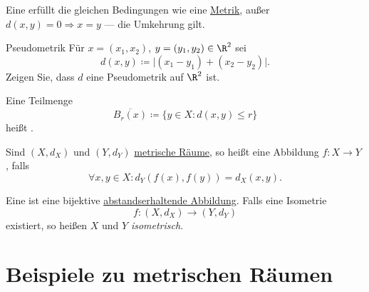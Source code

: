 \begin{definition}[Pseudometrik]\label{def:pseudometrik}
  Eine  erfüllt die gleichen Bedingungen wie eine \hyperref[def:metrik]{Metrik}, außer \( d(x,y) = 0 \Rightarrow x = y \) --- die Umkehrung gilt.
\end{definition}

\begin{assignment}{Pseudometrik}
  Für \( x = (x_1, x_2) \), \( y = (y_1, y_2) \in \R^2 \) sei
  \begin{equation*}
    d(x,y) \coloneqq \vert (x_1 - y_1) + (x_2-y_2) \vert\text{.}
  \end{equation*}
  Zeigen Sie, dass \( d \) eine Pseudometrik auf \( \R^2 \) ist.
\end{assignment}

\begin{definition}\label{def:abgeschlossenerBall}
  Eine Teilmenge
  \begin{equation*}
    \overline{B_r(x)} \coloneqq \{ y \in X : d(x,y) \leq r \}
  \end{equation*}
  heißt .
\end{definition}

\begin{definition}\label{def:abstandserhaltendeAbbildung}
  Sind \( (X, d_X) \) und \( (Y, d_Y) \) \hyperref[def:metrischerRaum]{metrische Räume}, so heißt eine Abbildung \( f: X \to Y \) , falls
  \begin{equation*}
    \forall x, y \in X: d_Y(f(x), f(y)) = d_X(x, y)\text{.}
  \end{equation*}
\end{definition}

\begin{definition}[Isometrie]\label{def:isometrie}
  Eine  ist eine bijektive \hyperref[def:abstandserhaltendeAbbildung]{abstandserhaltende Abbildung}. Falls eine Isometrie
  \begin{equation*}
    f: (X, d_X) \to (Y, d_Y)
  \end{equation*}
  existiert, so heißen \( X \) und \( Y \) \emph{isometrisch}.
\end{definition}

\section{Beispiele zu metrischen Räumen}

